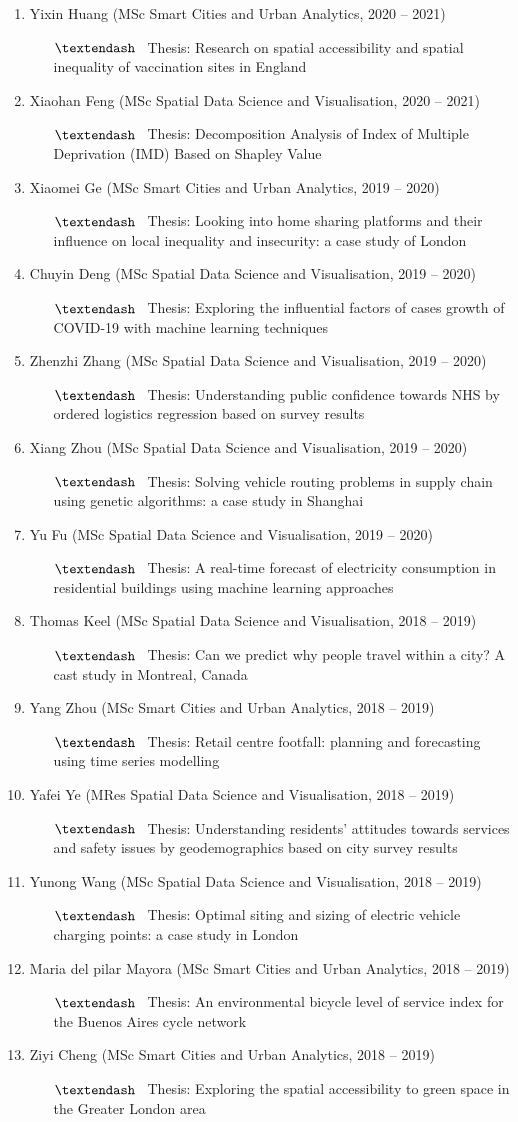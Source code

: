 \documentclass[A4,11pt]{article}
\newcommand{\MScStduentItem}[4]{
  \item #1 (#2, #3)
   \begin{itemize}
    \item[$\textendash$] \ #4
   \end{itemize}
}
\begin{document}
\begin{CJK*}{UTF8}{gbsn}
\begin{enumerate}
\begin{enumerate}
\begin{enumerate}
           \MScStduentItem{Yixin Huang}{MSc Smart Cities and Urban Analytics}{2020 -- 2021}
           {Thesis: Research on spatial accessibility and spatial inequality of vaccination sites in England}
           \MScStduentItem{Xiaohan Feng}{MSc Spatial Data Science and Visualisation}{2020 -- 2021}
           {Thesis: Decomposition Analysis of Index of Multiple Deprivation (IMD) Based on Shapley Value}
           \MScStduentItem{Xiaomei Ge}{MSc Smart Cities and Urban Analytics}{2019 -- 2020}
           {Thesis: Looking into home sharing platforms and their influence on local inequality and insecurity: a case study of London}
           \MScStduentItem{Chuyin Deng} {MSc Spatial Data Science and Visualisation}{2019 -- 2020}
            {Thesis: Exploring the influential factors of cases growth of COVID-19 with machine learning techniques}
           \MScStduentItem{Zhenzhi Zhang}{MSc Spatial Data Science and Visualisation}{2019 -- 2020}
            {Thesis: Understanding public confidence towards NHS by ordered logistics regression based on survey results}
          \MScStduentItem{Xiang Zhou}{MSc Spatial Data Science and Visualisation}{2019 -- 2020}
           {Thesis: Solving vehicle routing problems in supply chain using genetic algorithms: a case study in Shanghai}
          \MScStduentItem{Yu Fu}{MSc Spatial Data Science and Visualisation}{2019 -- 2020}
           {Thesis: A real-time forecast of electricity consumption in residential buildings using machine learning approaches}
          \MScStduentItem{Thomas Keel}{MSc Spatial Data Science and Visualisation}{2018 -- 2019}
           {Thesis: Can we predict why people travel within a city? A cast study in Montreal, Canada}
          \MScStduentItem{Yang Zhou}{MSc Smart Cities and Urban Analytics}{2018 -- 2019}
           {Thesis: Retail centre footfall: planning and forecasting using time series modelling}
          \MScStduentItem{Yafei Ye}{MRes Spatial Data Science and Visualisation}{2018 -- 2019}
           {Thesis: Understanding residents’ attitudes towards services and safety issues by geodemographics based on city survey results}
          \MScStduentItem{Yunong Wang}{MSc Spatial Data Science and Visualisation}{2018 -- 2019}
           {Thesis: Optimal siting and sizing of electric vehicle charging points: a case study in London}
          \MScStduentItem{Maria del pilar Mayora}{MSc Smart Cities and Urban Analytics}{2018 -- 2019}
           {Thesis: An environmental bicycle level of service index for the Buenos Aires cycle network}
          \MScStduentItem{Ziyi Cheng}{MSc Smart Cities and Urban Analytics}{2018 -- 2019}
           {Thesis: Exploring the spatial accessibility to green space in the Greater London area}


\end{enumerate}
\end{enumerate}
\end{enumerate}
\end{CJK*}
\end{document}
